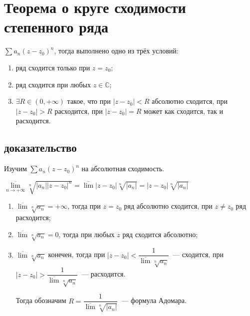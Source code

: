 \documentclass{article}
\begin{document}
    \newpage
    
    \section{Теорема о круге сходимости степенного ряда}
    
        $\sum a_n (z - z_0)^n$, тогда выполнено одно из трёх условий:
        
        \begin{enumerate}
        
            \item ряд сходится только при $z = z_0$;
            
            \item ряд сходится при любых $z \in \mathbb{C}$;
            
            \item $\exists R \in (0, +\infty)$ такое, что при $|z - z_0| < R$ абсолютно сходится, при $|z - z_0| > R$ расходится, при $|z - z_0| = R$ может как сходится, так и расходится.
            
        \end{enumerate}
        
        \subsection{доказательство}
        
            Изучим $\sum a_n (z - z_0)^n$ на абсолютная сходимость.
            
            $\overline{\lim\limits_{n \rightarrow +\infty}} \sqrt[n]{|a_n||z - z_0|^n} = \overline{\lim} |z - z_0| \sqrt[n]{|a_n|} = |z - z_0| \sqrt[n]{|a_n|}$
            
            \begin{enumerate}
            
                \item $\overline{\lim} \sqrt[n]{a_n} = +\infty$, тогда при $z = z_0$ ряд абсолютно сходится, при $z \neq z_0$ ряд расходится;
                
                \item $\overline{\lim} \sqrt[n]{a_n} = 0$, тогда при любых $z$ ряд сходится абсолютно;
                
                \item $\overline{\lim} \sqrt[n]{a_n}$ конечен, тогда при $|z - z_0| < \dfrac{1}{\overline{\lim}\sqrt[n]{a_n}}$~--- сходится, при $|z - z_0| > \dfrac{1}{\overline{\lim}\sqrt[n]{a_n}}$~--- расходится.
                
                    Тогда обозначим $R = \dfrac{1}{\overline{\lim}\sqrt[n]{|a_n|}}$~--- формула Адомара.
                
            \end{enumerate}
            
\end{document}
